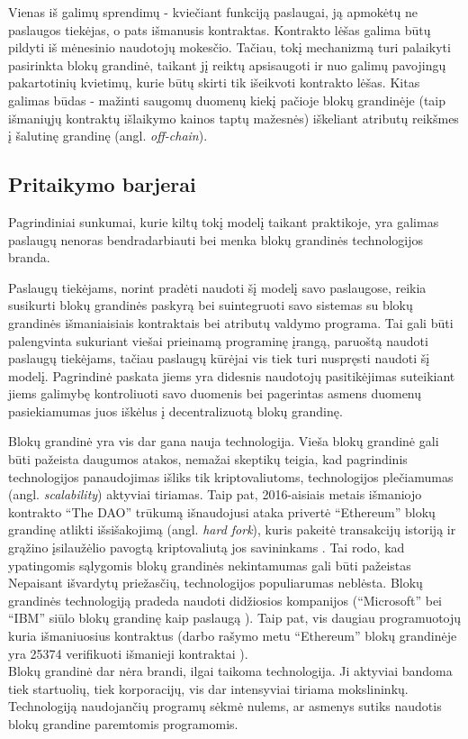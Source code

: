 Vienas iš galimų sprendimų - kviečiant funkciją paslaugai, ją apmokėtų ne paslaugos tiekėjas, o pats išmanusis kontraktas. Kontrakto lėšas
galima būtų pildyti iš mėnesinio naudotojų mokesčio.
Tačiau, tokį mechanizmą turi palaikyti pasirinkta blokų grandinė, taikant jį reiktų apsisaugoti ir nuo
galimų pavojingų pakartotinių kvietimų, kurie būtų skirti tik išeikvoti kontrakto lėšas. Kitas galimas būdas - mažinti saugomų duomenų kiekį
pačioje blokų grandinėje (taip išmaniųjų kontraktų išlaikymo kainos taptų mažesnės) iškeliant atributų reikšmes į šalutinę grandinę (angl. \textit{off-chain}).

\subsection{Pritaikymo barjerai}

Pagrindiniai sunkumai, kurie kiltų tokį modelį taikant praktikoje, yra galimas paslaugų nenoras bendradarbiauti bei menka blokų grandinės
technologijos branda.

Paslaugų tiekėjams, norint pradėti naudoti šį modelį savo paslaugose, reikia susikurti blokų grandinės paskyrą bei suintegruoti
savo sistemas su blokų grandinės išmaniaisiais kontraktais bei atributų valdymo programa.
Tai gali būti palengvinta sukuriant viešai prieinamą programinę įrangą, paruoštą naudoti paslaugų
tiekėjams, tačiau paslaugų kūrėjai vis tiek turi nuspręsti naudoti šį modelį. Pagrindinė paskata jiems yra didesnis naudotojų pasitikėjimas
suteikiant jiems galimybę kontroliuoti savo duomenis bei pagerintas asmens duomenų pasiekiamumas juos iškėlus į decentralizuotą blokų grandinę.

Blokų grandinė yra vis dar gana nauja technologija. Vieša blokų grandinė gali būti pažeista daugumos atakos, nemažai skeptikų
teigia, kad pagrindinis technologijos panaudojimas išliks tik kriptovaliutoms, technologijos plečiamumas (angl. \textit{scalability}) aktyviai
tiriamas. Taip pat, 2016-aisiais metais išmaniojo kontrakto \enquote{The DAO} trūkumą išnaudojusi ataka privertė \enquote{Ethereum} 
blokų grandinę atlikti išsišakojimą (angl. \textit{hard fork}), kuris pakeitė transakcijų istoriją ir grąžino įsilaužėlio
pavogtą kriptovaliutą jos savininkams \cite{TheDAO}. Tai rodo, kad ypatingomis sąlygomis blokų grandinės nekintamumas gali būti pažeistas\\
Nepaisant išvardytų priežasčių, technologijos populiarumas neblėsta. Blokų grandinės technologiją pradeda naudoti didžiosios kompanijos
(\enquote{Microsoft} bei \enquote{IBM} siūlo
blokų grandinę kaip paslaugą \cite{Zheng2017}). Taip pat, vis daugiau programuotojų kuria išmaniuosius kontraktus
(darbo rašymo metu \enquote{Ethereum} blokų grandinėje yra 25374 verifikuoti išmanieji kontraktai \cite{EthVerifiedContracts}).\\
Blokų grandinė dar nėra brandi, ilgai taikoma technologija. Ji aktyviai bandoma tiek startuolių, tiek
korporacijų, vis dar intensyviai tiriama mokslininkų. Technologiją naudojančių programų sėkmė nulems, ar asmenys
sutiks naudotis blokų grandine paremtomis programomis.




